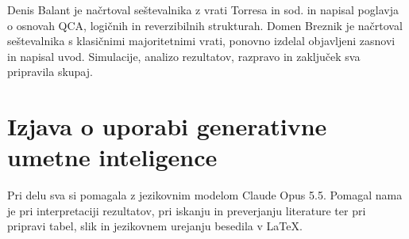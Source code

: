 Denis Balant je načrtoval seštevalnika z vrati Torresa in sod. in napisal poglavja o osnovah QCA, logičnih in reverzibilnih strukturah. Domen Breznik je načrtoval seštevalnika s klasičnimi majoritetnimi vrati, ponovno izdelal objavljeni zasnovi in napisal uvod. Simulacije, analizo rezultatov, razpravo in zaključek sva pripravila skupaj.

\section*{Izjava o uporabi generativne umetne inteligence}

Pri delu sva si pomagala z jezikovnim modelom Claude Opus 5.5. Pomagal nama je pri interpretaciji rezultatov, pri iskanju in preverjanju literature ter pri pripravi tabel, slik in jezikovnem urejanju besedila v \LaTeX{}.
